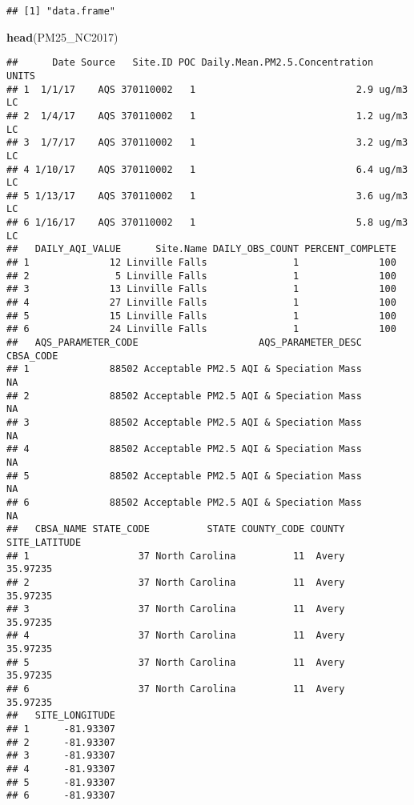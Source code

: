 \documentclass[]{article}
\newenvironment{Shaded}{\begin{snugshade}}{\end{snugshade}}
\newcommand{\KeywordTok}[1]{\textcolor[rgb]{0.13,0.29,0.53}{\textbf{#1}}}
\newcommand{\NormalTok}[1]{#1}
\begin{document}
\begin{verbatim}
## [1] "data.frame"
\end{verbatim}

\begin{Shaded}
\begin{Highlighting}[]
\KeywordTok{head}\NormalTok{(PM25_NC2017)}
\end{Highlighting}
\end{Shaded}

\begin{verbatim}
##      Date Source   Site.ID POC Daily.Mean.PM2.5.Concentration    UNITS
## 1  1/1/17    AQS 370110002   1                            2.9 ug/m3 LC
## 2  1/4/17    AQS 370110002   1                            1.2 ug/m3 LC
## 3  1/7/17    AQS 370110002   1                            3.2 ug/m3 LC
## 4 1/10/17    AQS 370110002   1                            6.4 ug/m3 LC
## 5 1/13/17    AQS 370110002   1                            3.6 ug/m3 LC
## 6 1/16/17    AQS 370110002   1                            5.8 ug/m3 LC
##   DAILY_AQI_VALUE      Site.Name DAILY_OBS_COUNT PERCENT_COMPLETE
## 1              12 Linville Falls               1              100
## 2               5 Linville Falls               1              100
## 3              13 Linville Falls               1              100
## 4              27 Linville Falls               1              100
## 5              15 Linville Falls               1              100
## 6              24 Linville Falls               1              100
##   AQS_PARAMETER_CODE                     AQS_PARAMETER_DESC CBSA_CODE
## 1              88502 Acceptable PM2.5 AQI & Speciation Mass        NA
## 2              88502 Acceptable PM2.5 AQI & Speciation Mass        NA
## 3              88502 Acceptable PM2.5 AQI & Speciation Mass        NA
## 4              88502 Acceptable PM2.5 AQI & Speciation Mass        NA
## 5              88502 Acceptable PM2.5 AQI & Speciation Mass        NA
## 6              88502 Acceptable PM2.5 AQI & Speciation Mass        NA
##   CBSA_NAME STATE_CODE          STATE COUNTY_CODE COUNTY SITE_LATITUDE
## 1                   37 North Carolina          11  Avery      35.97235
## 2                   37 North Carolina          11  Avery      35.97235
## 3                   37 North Carolina          11  Avery      35.97235
## 4                   37 North Carolina          11  Avery      35.97235
## 5                   37 North Carolina          11  Avery      35.97235
## 6                   37 North Carolina          11  Avery      35.97235
##   SITE_LONGITUDE
## 1      -81.93307
## 2      -81.93307
## 3      -81.93307
## 4      -81.93307
## 5      -81.93307
## 6      -81.93307
\end{verbatim}
\end{document}
